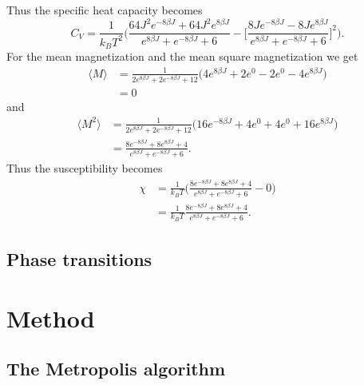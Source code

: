 \documentclass[notitlepage, reprint, nofootinbib]{revtex4-1}
\begin{document}
Thus the specific heat capacity becomes 
\begin{equation*} C_V=\frac{1}{k_BT^2}\Big(\frac{64J^2e^{-8\beta J} + 64J^2e^{8\beta J}}{e^{8\beta J}+e^{-8\beta J}+6} - \Big[\frac{8Je^{-8\beta J} - 8Je^{8\beta J}}{e^{8\beta J}+e^{-8\beta J}+6}\Big]^2\Big).\end{equation*}
For the mean magnetization and the mean square magnetization we get 
\begin{align*}
	\langle M\rangle &= \frac{1}{2e^{8\beta J}+2e^{-8\beta J}+12}\Big(4e^{8\beta J}+2e^0-2e^0-4e^{8\beta J}\Big)\\
	&=0
\end{align*}
and
\begin{align*}
	\langle M^2 \rangle &=\frac{1}{2e^{8\beta J}+2e^{-8\beta J}+12}\Big(16e^{-8\beta J}+4e^0+4e^0+16e^{8\beta J}\Big)\\
	&= \frac{8e^{-8\beta J}+8e^{8\beta J}+4}{e^{8\beta J}+e^{-8\beta J}+6}.
\end{align*}
Thus the susceptibility becomes 
\begin{align*}
	\chi &= \frac{1}{k_BT}\Big(\frac{8e^{-8\beta J}+8e^{8\beta J}+4}{e^{8\beta J}+e^{-8\beta J}+6} - 0\Big)\\
	&=\frac{1}{k_BT} \frac{8e^{-8\beta J}+8e^{8\beta J}+4}{e^{8\beta J}+e^{-8\beta J}+6}.
\end{align*}
{\color{red}{Figure out why dividing by 4 is necessary for numerical chi.....}}

\subsection{Phase transitions}

\section{Method}
\subsection{The Metropolis algorithm}
\end{document}
